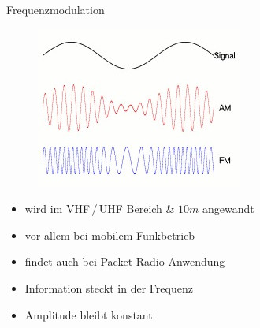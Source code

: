 \begin{frame}{Frequenzmodulation}
  \begin{center}
    \begin{figure}
      \includegraphics[width=\textwidth,height=.4\textheight,keepaspectratio]{e14/modulationen.jpg}
    \end{figure}
    \begin{itemize}
      \item wird im VHF\,/\,UHF Bereich \& $10m$ angewandt
      \item vor allem bei mobilem Funkbetrieb
      \item findet auch bei Packet-Radio Anwendung
      \item Information steckt in der Frequenz
      \item Amplitude bleibt konstant
    \end{itemize}
  \end{center}
\end{frame}
%


